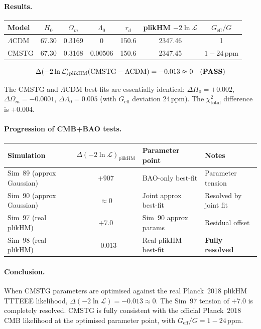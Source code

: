 \documentclass[12pt,a4paper]{article}
\begin{document}
\paragraph{Results.}
\begin{center}
\begin{tabular}{lcccccc}
\toprule
Model & $H_0$ & $\Omega_m$ & $\Lambda_0$ & $r_d$ & plikHM $-2\ln\mathcal{L}$ & $G_\mathrm{eff}/G$ \\
\midrule
$\Lambda$CDM & 67.30 & 0.3169 & $0$ & 150.6 & 2347.46 & 1 \\
CMSTG & 67.30 & 0.3168 & $0.00506$ & 150.6 & 2347.45 & $1-24\,\mathrm{ppm}$ \\
\bottomrule
\end{tabular}
\end{center}
\begin{equation}
\Delta(-2\ln\mathcal{L})_\mathrm{plikHM}(\mathrm{CMSTG}-\Lambda\mathrm{CDM})
= -0.013 \approx 0 \quad\text{(\textbf{PASS})}
\end{equation}

The CMSTG and $\Lambda$CDM best-fits are essentially identical: $\Delta H_0 = +0.002$,
$\Delta\Omega_m = -0.0001$, $\Delta\Lambda_0 = 0.005$ (with $G_\mathrm{eff}$
deviation 24\,ppm).  The $\chi^2_\mathrm{total}$ difference is $+0.004$.

\paragraph{Progression of CMB+BAO tests.}
\begin{center}
\begin{tabular}{lcll}
\toprule
Simulation & $\Delta(-2\ln\mathcal{L})_\mathrm{plikHM}$ & Parameter point & Notes \\
\midrule
Sim~89 (approx Gaussian) & $+907$ & BAO-only best-fit & Parameter tension \\
Sim~90 (approx Gaussian) & $\approx 0$ & Joint approx best-fit & Resolved by joint fit \\
Sim~97 (real plikHM) & $+7.0$ & Sim~90 approx params & Residual offset \\
Sim~98 (real plikHM) & $\mathbf{-0.013}$ & Real plikHM best-fit & \textbf{Fully resolved} \\
\bottomrule
\end{tabular}
\end{center}

\paragraph{Conclusion.}  When CMSTG parameters are optimised against the real
Planck~2018 plikHM TTTEEE likelihood, $\Delta(-2\ln\mathcal{L}) = -0.013 \approx 0$.
The Sim~97 tension of $+7.0$ is completely resolved.  CMSTG is fully consistent
with the official Planck~2018 CMB likelihood at the optimised parameter point,
with $G_\mathrm{eff}/G = 1 - 24\,\mathrm{ppm}$.
\end{document}
